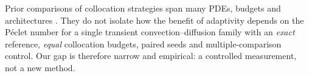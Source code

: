 Prior comparisons of collocation strategies span many PDEs, budgets and architectures \citep{wu2023sampling,daw2022r3}.
They do not isolate how the benefit of adaptivity depends on the P\'eclet number for a single transient
convection--diffusion family with an \emph{exact} reference, \emph{equal} collocation budgets, paired seeds and
multiple-comparison control. Our gap is therefore narrow and empirical: a controlled measurement, not a new method.
